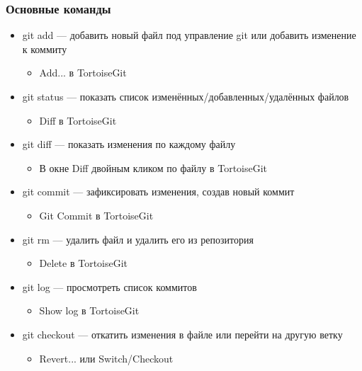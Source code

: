 \documentclass[xetex,mathserif,serif]{beamer}
\begin{document}
    \begin{frame}
        \frametitle{Основные команды}
        \begin{itemize}
            \item git add --- добавить новый файл под управление git или добавить изменение к коммиту
            \begin{itemize}
                \item Add... в TortoiseGit
            \end{itemize}
            \item git status --- показать список изменённых/добавленных/удалённых файлов
            \begin{itemize}
                \item Diff в TortoiseGit
            \end{itemize}
            \item git diff --- показать изменения по каждому файлу
            \begin{itemize}
                \item В окне Diff двойным кликом по файлу в TortoiseGit
            \end{itemize}
            \item git commit --- зафиксировать изменения, создав новый коммит
            \begin{itemize}
                \item Git Commit в TortoiseGit
            \end{itemize}
            \item git rm --- удалить файл и удалить его из репозитория
            \begin{itemize}
                \item Delete в TortoiseGit
            \end{itemize}
            \item git log --- просмотреть список коммитов
            \begin{itemize}
                \item Show log в TortoiseGit
            \end{itemize}
            \item git checkout --- откатить изменения в файле или перейти на другую ветку
            \begin{itemize}
                \item Revert... или Switch/Checkout
            \end{itemize}
        \end{itemize}
    \end{frame}
\end{document}
